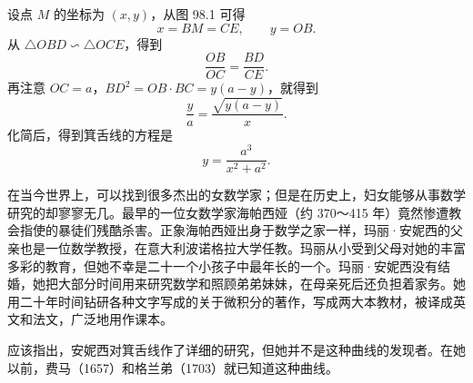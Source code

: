 设点 $M$ 的坐标为 $(x, y)$，从图 98.1 可得
\[
  x = BM = CE, \qquad y = OB.
\]
从 $\triangle OBD \backsim \triangle OCE$，得到
\[
  \frac{OB}{OC} = \frac{BD}{CE}.
\]
再注意 $OC = a$，$BD^2 = OB \cdot BC = y(a - y)$，就得到
\[
  \frac{y}{a} = \frac{\sqrt{y(a - y)}}{x}.
\]
化简后，得到箕舌线的方程是
\[
  y = \frac{a^3}{x^2 + a^2}.
\]

在当今世界上，可以找到很多杰出的女数学家；但是在历史上，妇女能够从事数学研究的却寥寥无几。最早的一位女数学家海帕西娅（约 370～415 年）竟然惨遭教会指使的暴徒们残酷杀害。正象海帕西娅出身于数学之家一样，玛丽·安妮西的父亲也是一位数学教授，在意大利波诺格拉大学任教。玛丽从小受到父母对她的丰富多彩的教育，但她不幸是二十一个小孩子中最年长的一个。玛丽·安妮西没有结婚，她把大部分时间用来研究数学和照顾弟弟妹妹，在母亲死后还负担着家务。她用二十年时间钻研各种文字写成的关于微积分的著作，写成两大本教材，被译成英文和法文，广泛地用作课本。

应该指出，安妮西对箕舌线作了详细的研究，但她并不是这种曲线的发现者。在她以前，费马（1657）和格兰弟（1703）就已知道这种曲线。
